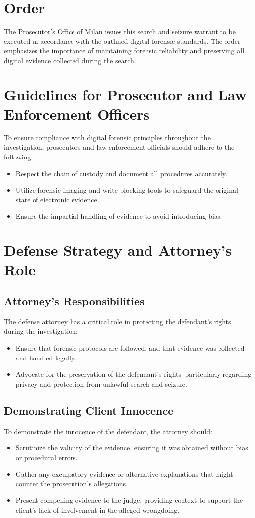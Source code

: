\section{Order}
The Prosecutor’s Office of Milan issues this search and seizure warrant to be executed in accordance with the outlined digital forensic standards. The order emphasizes the importance of maintaining forensic reliability and preserving all digital evidence collected during the search.

\section{Guidelines for Prosecutor and Law Enforcement Officers}
To ensure compliance with digital forensic principles throughout the investigation, prosecutors and law enforcement officials should adhere to the following:
\begin{itemize}
    \item Respect the chain of custody and document all procedures accurately.
    \item Utilize forensic imaging and write-blocking tools to safeguard the original state of electronic evidence.
    \item Ensure the impartial handling of evidence to avoid introducing bias.
\end{itemize}

\section{Defense Strategy and Attorney’s Role}
\subsection{Attorney’s Responsibilities}
The defense attorney has a critical role in protecting the defendant's rights during the investigation:
\begin{itemize}
    \item Ensure that forensic protocols are followed, and that evidence was collected and handled legally.
    \item Advocate for the preservation of the defendant’s rights, particularly regarding privacy and protection from unlawful search and seizure.
\end{itemize}

\subsection{Demonstrating Client Innocence}
To demonstrate the innocence of the defendant, the attorney should:
\begin{itemize}
    \item Scrutinize the validity of the evidence, ensuring it was obtained without bias or procedural errors.
    \item Gather any exculpatory evidence or alternative explanations that might counter the prosecution’s allegations.
    \item Present compelling evidence to the judge, providing context to support the client's lack of involvement in the alleged wrongdoing.
\end{itemize}

